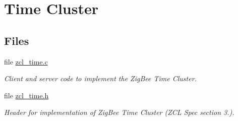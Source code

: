 \hypertarget{group__zcl__time}{\section{Time Cluster}
\label{group__zcl__time}
}
\subsection*{Files}
\begin{DoxyCompactItemize}
\item 
file \hyperlink{zcl__time_8c}{zcl\-\_\-time.\-c}
\begin{DoxyCompactList}\small\item\em Client and server code to implement the Zig\-Bee Time Cluster. \end{DoxyCompactList}\item 
file \hyperlink{zcl__time_8h}{zcl\-\_\-time.\-h}
\begin{DoxyCompactList}\small\item\em Header for implementation of Zig\-Bee Time Cluster (Z\-C\-L Spec section 3.). \end{DoxyCompactList}\end{DoxyCompactItemize}
